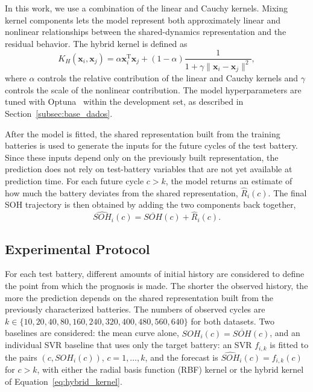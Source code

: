 \documentclass[conference]{IEEEtran}
\begin{document}
In this work, we use a combination of the linear and Cauchy kernels. Mixing kernel components lets the model represent both approximately linear and nonlinear relationships between the shared-dynamics representation and the residual behavior. The hybrid kernel is defined as
\begin{equation}
    K_H(\mathbf{x}_i,\mathbf{x}_j)
    =
    \alpha \mathbf{x}_i^{\mathrm{T}}\mathbf{x}_j
    +
    (1-\alpha)\frac{1}{1+\gamma\|\mathbf{x}_i-\mathbf{x}_j\|^2},
    \label{eq:hybrid_kernel}
\end{equation}
where $\alpha$ controls the relative contribution of the linear and Cauchy kernels
and $\gamma$ controls the scale of the nonlinear contribution. The model hyperparameters are tuned with Optuna~\cite{akiba2019optuna} within the development set, as described in Section~\ref{subsec:base_dados}.


After the model is fitted, the shared representation built from the training batteries is used to generate the inputs for the future cycles of the test battery. Since these inputs depend only on the previously built representation, the prediction does not rely on test-battery variables that are not yet available at prediction time. For each future cycle $c>k$, the model returns an estimate of how much the battery deviates from the shared representation, $\widehat{R}_i(c)$.
The final SOH trajectory is then obtained by adding the two components back together,
\begin{equation}
    \widehat{SOH}_i(c)
    =
    \overline{SOH}(c)
    +
    \widehat{R}_i(c).
    \label{eq:final_prediction}
\end{equation}


\subsection{Experimental Protocol}
\label{subsec:protocolo_experimental}

For each test battery, different amounts of initial history are considered to define the point from which the prognosis is made. The shorter the observed history, the more the prediction depends on the shared representation built from the previously characterized batteries. The numbers of observed cycles are $k \in \{10, 20, 40, 80, 160, 240, 320, 400, 480, 560, 640\}$ for both datasets. Two baselines are considered: the mean curve alone, $\widehat{SOH}_i(c)=\overline{SOH}(c)$, and an individual SVR baseline that uses only the target battery: an SVR $f_{i,k}$ is fitted to the pairs $(c,SOH_i(c))$, $c=1,\ldots,k$, and the forecast is $\widehat{SOH}_i(c)=f_{i,k}(c)$ for $c>k$, with either the radial basis function (RBF) kernel or the hybrid kernel of Equation~\eqref{eq:hybrid_kernel}.
\end{document}
